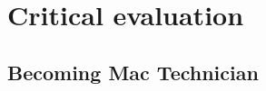 \documentclass[10pt,a4paper,headinclude=true]{report}
\begin{document}
\chapter{Critical evaluation}
\section{Becoming Mac Technician}


\end{document}

